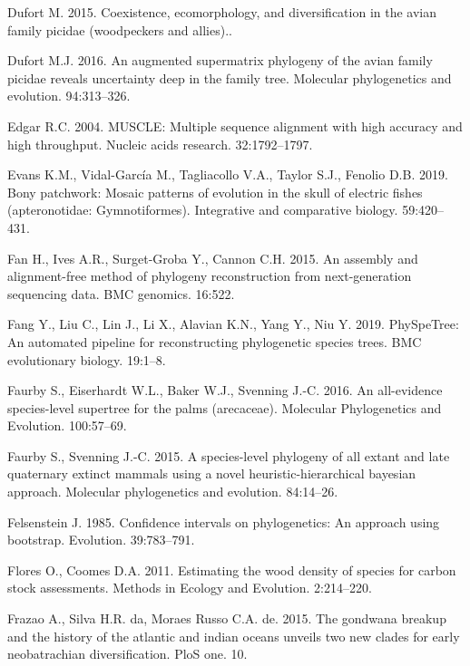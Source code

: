 \documentclass[]{article}
\begin{document}
\leavevmode\hypertarget{ref-dufort2015coexistence}{}%
Dufort M. 2015. Coexistence, ecomorphology, and diversification in the avian family picidae (woodpeckers and allies)..

\leavevmode\hypertarget{ref-dufort2016augmented}{}%
Dufort M.J. 2016. An augmented supermatrix phylogeny of the avian family picidae reveals uncertainty deep in the family tree. Molecular phylogenetics and evolution. 94:313--326.

\leavevmode\hypertarget{ref-edgar2004muscle}{}%
Edgar R.C. 2004. MUSCLE: Multiple sequence alignment with high accuracy and high throughput. Nucleic acids research. 32:1792--1797.

\leavevmode\hypertarget{ref-evans2019bony}{}%
Evans K.M., Vidal-García M., Tagliacollo V.A., Taylor S.J., Fenolio D.B. 2019. Bony patchwork: Mosaic patterns of evolution in the skull of electric fishes (apteronotidae: Gymnotiformes). Integrative and comparative biology. 59:420--431.

\leavevmode\hypertarget{ref-fan2015assembly}{}%
Fan H., Ives A.R., Surget-Groba Y., Cannon C.H. 2015. An assembly and alignment-free method of phylogeny reconstruction from next-generation sequencing data. BMC genomics. 16:522.

\leavevmode\hypertarget{ref-fang2019physpetree}{}%
Fang Y., Liu C., Lin J., Li X., Alavian K.N., Yang Y., Niu Y. 2019. PhySpeTree: An automated pipeline for reconstructing phylogenetic species trees. BMC evolutionary biology. 19:1--8.

\leavevmode\hypertarget{ref-faurby2016all}{}%
Faurby S., Eiserhardt W.L., Baker W.J., Svenning J.-C. 2016. An all-evidence species-level supertree for the palms (arecaceae). Molecular Phylogenetics and Evolution. 100:57--69.

\leavevmode\hypertarget{ref-faurby2015species}{}%
Faurby S., Svenning J.-C. 2015. A species-level phylogeny of all extant and late quaternary extinct mammals using a novel heuristic-hierarchical bayesian approach. Molecular phylogenetics and evolution. 84:14--26.

\leavevmode\hypertarget{ref-felsenstein1985confidence}{}%
Felsenstein J. 1985. Confidence intervals on phylogenetics: An approach using bootstrap. Evolution. 39:783--791.

\leavevmode\hypertarget{ref-flores2011estimating}{}%
Flores O., Coomes D.A. 2011. Estimating the wood density of species for carbon stock assessments. Methods in Ecology and Evolution. 2:214--220.

\leavevmode\hypertarget{ref-frazao2015gondwana}{}%
Frazao A., Silva H.R. da, Moraes Russo C.A. de. 2015. The gondwana breakup and the history of the atlantic and indian oceans unveils two new clades for early neobatrachian diversification. PloS one. 10.
\end{document}
